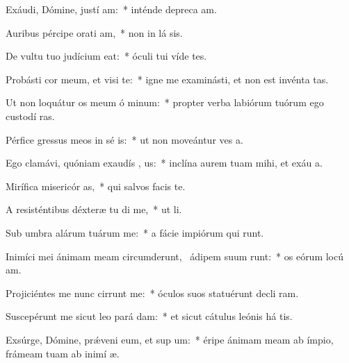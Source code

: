 \item Exáudi, Dómine, justí am:~* inténde depreca am.
\item Auribus pércipe orati am,~* non in lá sis.
\item De vultu tuo judícium  eat:~* óculi tui víde tes.
\item Probásti cor meum, et visi te:~* igne me examinásti, et non est invénta   tas.
\item Ut non loquátur os meum ó minum:~* propter verba labiórum tuórum ego custodí  ras.
\item Pérfice gressus meos in sé is:~* ut non moveántur ves a.
\item Ego clamávi, quóniam exaudís , us:~* inclína aurem tuam mihi, et exáu  a.
\item Mirífica misericór as,~* qui salvos facis   te.
\item A resisténtibus déxteræ tu di me,~* ut  li.
\item Sub umbra alárum tuárum  me:~* a fácie impiórum qui  runt.
\item Inimíci mei ánimam meam circumderunt,~\pscross{} ádipem suum runt:~* os eórum locú  am.
\item Projiciéntes me nunc cirrunt me:~* óculos suos statuérunt decli  ram.
\item Suscepérunt me sicut leo pará  dam:~* et sicut cátulus leónis há  tis.
\item Exsúrge, Dómine, prǽveni eum, et sup um:~* éripe ánimam meam ab ímpio, frámeam tuam ab inimí  æ.

